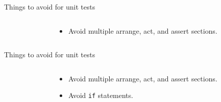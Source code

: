 \documentclass[english,handout,10pt,aspectratio=169,t]{beamer}
\begin{document}
\begin{frame}{Things to avoid for unit tests}
  \begin{columns}[T]
    \begin{column}[]{0.5\textwidth}
      \begin{minipage}{\linewidth}
        \begin{center}
        \end{center}
      \end{minipage}
    \end{column}
    \begin{column}[]{0.5\textwidth}
      \begin{itemize}
        \item Avoid multiple arrange, act, and assert sections.
      \end{itemize}
    \end{column}
  \end{columns}
\end{frame}

\begin{frame}{Things to avoid for unit tests}
  \begin{columns}[T]
    \begin{column}[]{0.5\textwidth}
      \begin{minipage}{\linewidth}
        \avoidifpkd
      \end{minipage}
    \end{column}
    \begin{column}[]{0.5\textwidth}
      \begin{itemize}
        \item Avoid multiple arrange, act, and assert sections.
        \item Avoid \texttt{if} statements. 
      \end{itemize}
    \end{column}
  \end{columns}
\end{frame}
\end{document}
